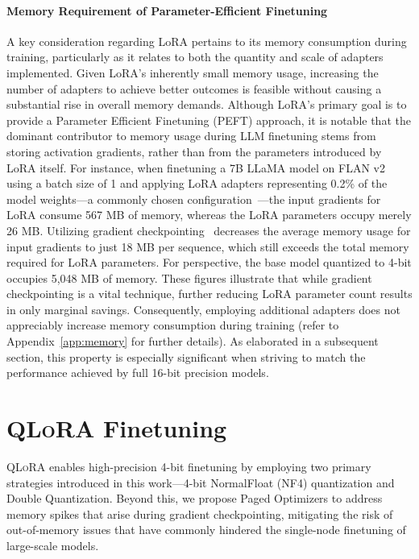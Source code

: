 \paragraph{Memory Requirement of Parameter-Efficient Finetuning} A key consideration regarding LoRA pertains to its memory consumption during training, particularly as it relates to both the quantity and scale of adapters implemented. Given LoRA's inherently small memory usage, increasing the number of adapters to achieve better outcomes is feasible without causing a substantial rise in overall memory demands. Although LoRA's primary goal is to provide a Parameter Efficient Finetuning (PEFT) approach, it is notable that the dominant contributor to memory usage during LLM finetuning stems from storing activation gradients, rather than from the parameters introduced by LoRA itself. For instance, when finetuning a 7B LLaMA model on FLAN v2 using a batch size of 1 and applying LoRA adapters representing 0.2\% of the model weights---a commonly chosen configuration~\citep{hu2021lora,liu2022few}---the input gradients for LoRA consume 567 MB of memory, whereas the LoRA parameters occupy merely 26 MB. Utilizing gradient checkpointing~\citep{chen2016training} decreases the average memory usage for input gradients to just 18 MB per sequence, which still exceeds the total memory required for LoRA parameters. For perspective, the base model quantized to 4-bit occupies 5,048 MB of memory. These figures illustrate that while gradient checkpointing is a vital technique, further reducing LoRA parameter count results in only marginal savings. Consequently, employing additional adapters does not appreciably increase memory consumption during training (refer to Appendix~\ref{app:memory} for further details). As elaborated in a subsequent section, this property is especially significant when striving to match the performance achieved by full 16-bit precision models.

\section{\textsc{QLoRA} Finetuning}

\textsc{QLoRA} enables high-precision 4-bit finetuning by employing two primary strategies introduced in this work—4-bit NormalFloat (NF4) quantization and Double Quantization. Beyond this, we propose Paged Optimizers to address memory spikes that arise during gradient checkpointing, mitigating the risk of out-of-memory issues that have commonly hindered the single-node finetuning of large-scale models.

